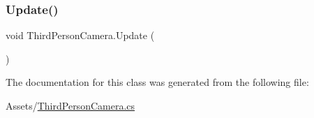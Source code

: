 \subsubsection{\texorpdfstring{Update()}{Update()}}
{\footnotesize\ttfamily void Third\+Person\+Camera.\+Update (\begin{DoxyParamCaption}{ }\end{DoxyParamCaption})\hspace{0.3cm}{\ttfamily [private]}}



The documentation for this class was generated from the following file\+:\begin{DoxyCompactItemize}
\item 
Assets/\hyperlink{_third_person_camera_8cs}{Third\+Person\+Camera.\+cs}\end{DoxyCompactItemize}

